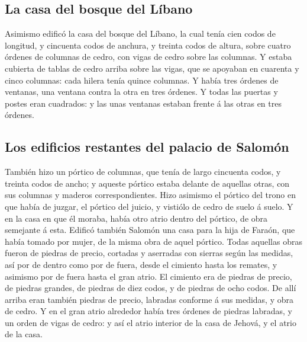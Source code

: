 \hypertarget{la-casa-del-bosque-del-luxedbano}{%
\subsection{La casa del bosque del
Líbano}\label{la-casa-del-bosque-del-luxedbano}}

 Asimismo edificó la casa del bosque del Líbano, la cual
tenía cien codos de longitud, y cincuenta codos de anchura, y treinta
codos de altura, sobre cuatro órdenes de columnas de cedro, con vigas de
cedro sobre las columnas.  Y estaba cubierta de tablas de
cedro arriba sobre las vigas, que se apoyaban en cuarenta y cinco
columnas: cada hilera tenía quince columnas.  Y había tres
órdenes de ventanas, una ventana contra la otra en tres órdenes.
 Y todas las puertas y postes eran cuadrados: y las unas
ventanas estaban frente á las otras en tres órdenes.

\hypertarget{los-edificios-restantes-del-palacio-de-salomuxf3n}{%
\subsection{Los edificios restantes del palacio de
Salomón}\label{los-edificios-restantes-del-palacio-de-salomuxf3n}}

 También hizo un pórtico de columnas, que tenía de largo
cincuenta codos, y treinta codos de ancho; y aqueste pórtico estaba
delante de aquellas otras, con sus columnas y maderos correspondientes.
 Hizo asimismo el pórtico del trono en que había de
juzgar, el pórtico del juicio, y vistiólo de cedro de suelo á suelo.
 Y en la casa en que él moraba, había otro atrio dentro
del pórtico, de obra semejante á esta. Edificó también Salomón una casa
para la hija de Faraón, que había tomado por mujer, de la misma obra de
aquel pórtico.  Todas aquellas obras fueron de piedras de
precio, cortadas y aserradas con sierras según las medidas, así por de
dentro como por de fuera, desde el cimiento hasta los remates, y
asimismo por de fuera hasta el gran atrio.  El cimiento
era de piedras de precio, de piedras grandes, de piedras de diez codos,
y de piedras de ocho codos.  De allí arriba eran también
piedras de precio, labradas conforme á sus medidas, y obra de cedro.
 Y en el gran atrio alrededor había tres órdenes de
piedras labradas, y un orden de vigas de cedro: y así el atrio interior
de la casa de Jehová, y el atrio de la casa.


